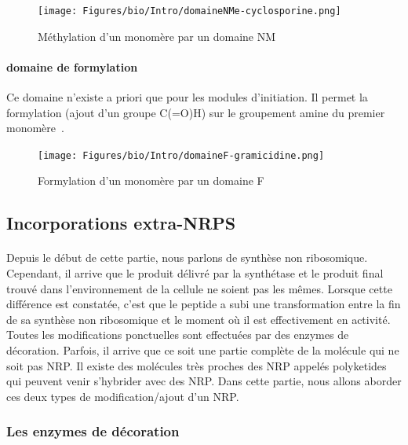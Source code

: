 \documentclass[12pt,french,twoside]{report}
\begin{document}
\begin{figure}[h!]
  \begin{center}
    \texttt{[image: Figures/bio/Intro/domaineNMe-cyclosporine.png]}
    \caption{\label{domaine_NMe}Méthylation d'un monomère par un domaine NM}
  \end{center}
\end{figure}

\paragraph{domaine de formylation}

Ce domaine n'existe a priori que pour les modules d'initiation.
Il permet la formylation (ajout d'un groupe C(=O)H) sur le groupement amine du premier monomère~\cite{schonafinger_amide_2007}.

\begin{figure}[h!]
  \begin{center}
    \texttt{[image: Figures/bio/Intro/domaineF-gramicidine.png]}
    \caption{\label{domaine_F}Formylation d'un monomère par un domaine F}
  \end{center}
\end{figure}


\subsection{Incorporations extra-NRPS}

\paragraph{}Depuis le début de cette partie, nous parlons de synthèse non ribosomique.
Cependant, il arrive que le produit délivré par la synthétase et le produit final trouvé dans l'environnement de la cellule ne soient pas les mêmes.
Lorsque cette différence est constatée, c'est que le peptide a subi une transformation entre la fin de sa synthèse non ribosomique et le moment où il est effectivement en activité.
Toutes les modifications ponctuelles sont effectuées par des enzymes de décoration.
Parfois, il arrive que ce soit une partie complète de la molécule qui ne soit pas NRP.
Il existe des molécules très proches des NRP appelés polyketides qui peuvent venir s'hybrider avec des NRP.
Dans cette partie, nous allons aborder ces deux types de modification/ajout d'un NRP.


\subsubsection{Les enzymes de décoration}
\end{document}
